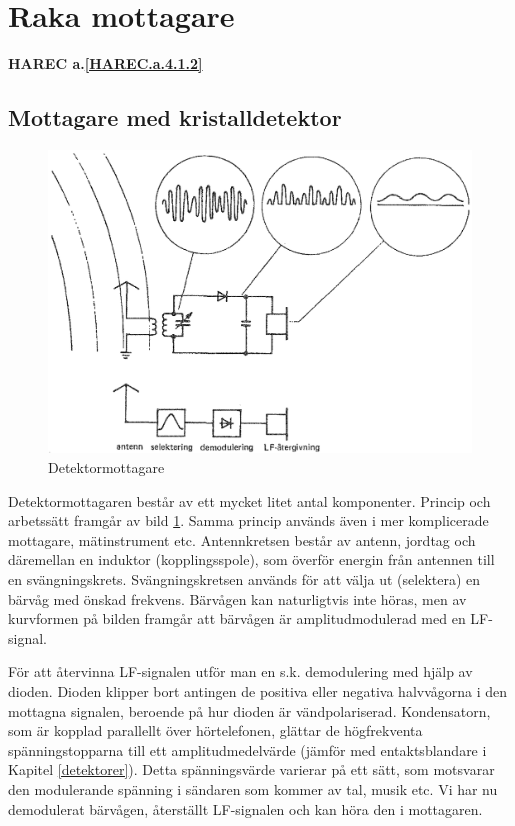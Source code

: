 \section{Raka mottagare}
\textbf{HAREC a.\ref{HAREC.a.4.1.2}\label{myHAREC.a.4.1.2}}

\subsection{Mottagare med kristalldetektor}

\begin{figure}
  \includegraphics[width=\textwidth]{images/cropped_pdfs/bild_2_4-01.pdf}
  \caption{Detektormottagare}
  \label{fig:bildII4-1}
\end{figure}

Detektormottagaren består av ett mycket litet antal komponenter.
Princip och arbetssätt framgår av bild \ref{fig:bildII4-1}.
Samma princip används även i mer komplicerade mottagare, mätinstrument etc.
Antennkretsen består av antenn, jordtag och däremellan en induktor
(kopplingsspole), som överför energin från antennen till en svängningskrets.
Svängningskretsen används för att välja ut (selektera)
en bärvåg med önskad frekvens.
Bärvågen kan naturligtvis inte höras, men av kurvformen på bilden framgår
att bärvågen är amplitudmodulerad med en LF-signal.

För att återvinna LF-signalen utför man en s.k. demodulering med hjälp
av dioden.
Dioden klipper bort antingen de positiva eller negativa halvvågorna i den
mottagna signalen, beroende på hur dioden är vändpolariserad.
Kondensatorn, som är kopplad parallellt över hörtelefonen, glättar de
högfrekventa spänningstopparna till ett amplitudmedelvärde (jämför med
entaktsblandare i Kapitel \ref{detektorer}).
Detta spänningsvärde varierar på ett sätt, som motsvarar den modulerande
spänning i sändaren som kommer av tal, musik etc.
Vi har nu demodulerat bärvågen, återställt LF-signalen och kan höra den i
mottagaren.

